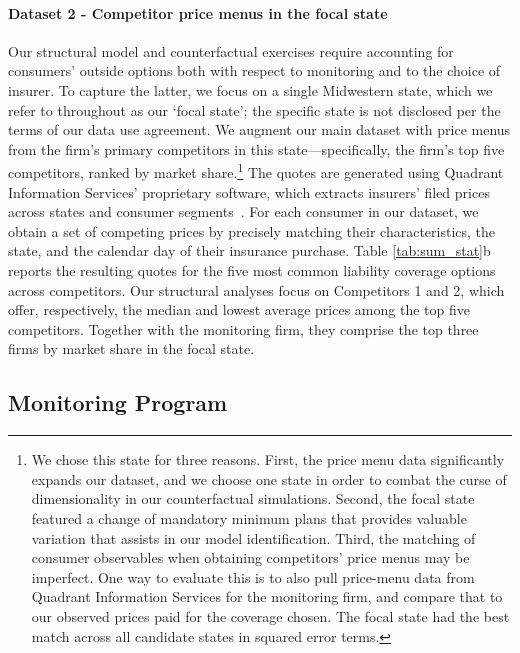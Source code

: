 \paragraph{Dataset 2 - Competitor price menus in the focal state}
Our structural model and counterfactual exercises require accounting for consumers' outside options both with respect to monitoring and to the choice of insurer.
To capture the latter, we focus on a single Midwestern state, which we refer to throughout as our `focal state'; the specific state is not disclosed per the terms of our data use agreement. We augment our main dataset with price menus from the firm's primary competitors in this state---specifically, the firm's top five competitors, ranked by market share.\footnote{We chose this state for three reasons. First, the price menu data significantly expands our dataset, and we choose one state in order to combat the curse of dimensionality in our counterfactual simulations. Second, the focal state featured a change of mandatory minimum plans that provides valuable variation that assists in our model identification. Third, the matching of consumer observables when obtaining competitors' price menus may be imperfect. One way to evaluate this is to also pull price-menu data from Quadrant Information Services for the monitoring firm, and compare that to our observed prices paid for the coverage chosen. The focal state had the best match across all candidate states in squared error terms.}
The quotes are generated using Quadrant Information Services' proprietary software, which extracts insurers' filed prices across states and consumer segments~\parencite{quadrant2016}.
For each consumer in our dataset, we obtain a set of competing prices by precisely matching their characteristics, the state, and the calendar day of their insurance purchase.
Table \ref{tab:sum_stat}b reports the resulting quotes for the five most common liability coverage options across competitors. Our structural analyses focus on Competitors 1 and 2, which offer, respectively, the median and lowest average prices among the top five competitors. Together with the monitoring firm, they comprise the top three firms by market share in the focal state.

\subsection{Monitoring Program\label{subsec:data_monitoring}}

